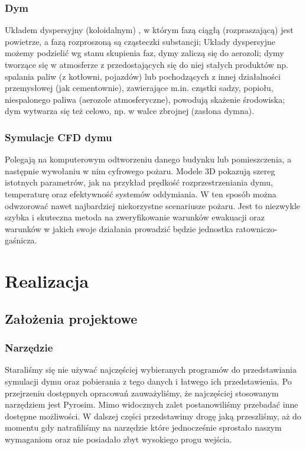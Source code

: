 \documentclass{article}
\begin{document}
	\vspace{4mm}
	\subsubsection{Dym} 
	Układem dyspersyjny (koloidalnym) , w którym fazą ciągłą (rozpraszającą) jest powietrze, a fazą rozproszoną są cząsteczki substancji; Układy dyspersyjne możemy podzielić wg stanu skupienia faz, dymy zaliczą się do aerozoli; dymy tworzące się w atmosferze z przedostających się do niej stałych produktów np. spalania paliw (z kotłowni, pojazdów) lub pochodzących z innej działalności przemysłowej (jak cementownie), zawierające m.in. cząstki sadzy, popiołu, niespalonego paliwa (aerozole atmosferyczne), powodują skażenie środowiska; dym wytwarza się też celowo, np. w walce zbrojnej (zasłona dymna).
	
	\vspace{4mm}
	\subsubsection{Symulacje CFD dymu}    
	Polegają na komputerowym odtworzeniu danego budynku lub pomieszczenia, a następnie wywołaniu w nim cyfrowego pożaru. Modele 3D pokazują szereg istotnych parametrów, jak na przykład prędkość rozprzestrzeniania dymu, temperaturę oraz efektywność systemów oddymiania. W ten sposób można odwzorować nawet najbardziej niekorzystne scenariusze pożaru. Jest to niezwykle szybka i skuteczna metoda na zweryfikowanie warunków ewakuacji oraz warunków w jakich swoje działania prowadzić będzie jednostka ratowniczo-gaśnicza.
	
	\vspace{12mm}
	\section{Realizacja}
	\subsection{Założenia projektowe}
	\vspace{3mm}
	
	\subsubsection{Narzędzie}
	Staraliśmy się nie używać najczęściej wybieranych programów do przedstawiania symulacji dymu oraz pobierania z tego danych i łatwego ich przedstawienia. Po przejrzeniu dostępnych opracowań zauważyliśmy, że najczęściej stosowanym narzędziem jest Pyrosim. Mimo widocznych zalet postanowiliśmy przebadać inne dostępne możliwości. W dalszej części przedstawimy drogę jaką przeszliśmy, aż do momentu gdy natrafiliśmy na narzędzie które jednocześnie sprostało naszym wymaganiom oraz nie posiadało zbyt wysokiego progu wejścia.
	
\end{document}
